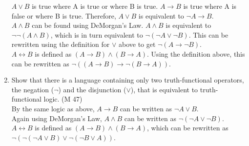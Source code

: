 \documentclass{article}
\begin{document}
\begin{enumerate}
\begin{itemize}
          \end{itemize}
          $A \lor B$ is true where A is true or where B is true. $A \to B$ is true where A is false or where B is true. Therefore, $A \lor B$ is equivalent to $\neg A \to B$.\\
          $A \land B$ can be found using DeMorgan's Law. $A \land B$ is equivalent to $\neg \neg(A \land B)$, which is in turn equivalent to $\neg(\neg A \lor \neg B)$. This can be rewritten using the definition for $\lor$ above to get $\neg (A \to \neg B)$.\\
          $A \leftrightarrow B$ is defined as $(A \to B) \land (B \to A)$. Using the definition above, this can be rewritten as $\neg ((A \to B) \to \neg (B \to A))$.
    \item Show that there is a language containing only two truth-functional operators, the negation ($\neg$) and the disjunction ($\lor$), that is equivalent to truth-functional logic. (M 47)\\
          By the same logic as above, $A \to B$ can be written as $\neg A \lor B$.\\
          Again using DeMorgan's Law, $A \land B$ can be written as $\neg(\neg A \lor \neg B)$.\\
          $A \leftrightarrow B$ is defined as $(A \to B) \land (B \to A)$, which can be rewritten as $\neg (\neg (\neg A \lor B) \lor \neg (\neg B \lor A))$.
\end{enumerate}
\end{document}

